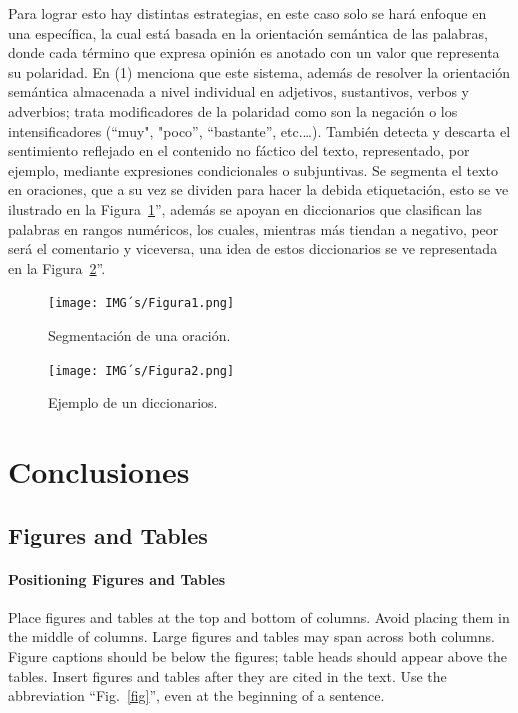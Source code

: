 \documentclass[conference]{IEEEtran}
\begin{document}
\begin{itemize}
  Para lograr esto hay distintas estrategias, en este caso solo se hará enfoque en una específica, la cual está basada en la orientación semántica de las palabras, donde cada término que expresa opinión es anotado con un valor que representa su polaridad. En (1) menciona que este sistema, además de resolver la orientación semántica almacenada a nivel individual en adjetivos, sustantivos, verbos y adverbios; trata modificadores de la polaridad como son la negación o los intensificadores (“muy", "poco”, “bastante”, etc.…). También detecta y descarta el sentimiento reflejado en el contenido no fáctico del texto, representado, por ejemplo, mediante expresiones condicionales o subjuntivas.
Se segmenta el texto en oraciones, que a su vez se dividen para hacer la debida etiquetación, esto se ve ilustrado en la Figura~\ref{fig1}'', además se apoyan en diccionarios que clasifican las palabras en rangos numéricos, los cuales, mientras más tiendan a negativo, peor será el comentario y viceversa, una idea de estos diccionarios se ve representada en la Figura~\ref{fig2}''.

\end{itemize}

\begin{figure}[htbp]
  \caption{Segmentación de una oración.}
  \centerline{\texttt{[image: IMG´s/Figura1.png]}}
  \label{fig1}
\end{figure}
\newpage
\begin{figure}[htbp]
  \caption{Ejemplo de un diccionarios.}
  \centerline{\texttt{[image: IMG´s/Figura2.png]}}
  \label{fig2}
\end{figure}

\section{Conclusiones}

\subsection{Figures and Tables}
\paragraph{Positioning Figures and Tables} Place figures and tables at the top and 
bottom of columns. Avoid placing them in the middle of columns. Large 
figures and tables may span across both columns. Figure captions should be 
below the figures; table heads should appear above the tables. Insert 
figures and tables after they are cited in the text. Use the abbreviation 
``Fig.~\ref{fig}'', even at the beginning of a sentence.
\end{document}
